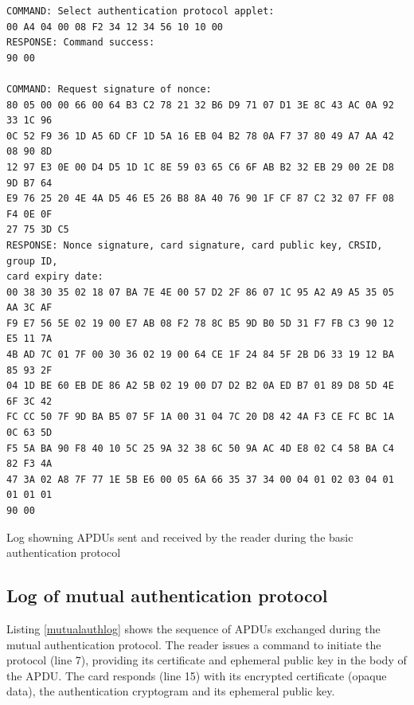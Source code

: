 \documentclass[12pt,a4paper,twoside,openright]{report}
\begin{document}
\begin{listing}
\begin{verbatim}
COMMAND: Select authentication protocol applet:
00 A4 04 00 08 F2 34 12 34 56 10 10 00
RESPONSE: Command success:
90 00

COMMAND: Request signature of nonce:
80 05 00 00 66 00 64 B3 C2 78 21 32 B6 D9 71 07 D1 3E 8C 43 AC 0A 92 33 1C 96
0C 52 F9 36 1D A5 6D CF 1D 5A 16 EB 04 B2 78 0A F7 37 80 49 A7 AA 42 08 90 8D
12 97 E3 0E 00 D4 D5 1D 1C 8E 59 03 65 C6 6F AB B2 32 EB 29 00 2E D8 9D B7 64
E9 76 25 20 4E 4A D5 46 E5 26 B8 8A 40 76 90 1F CF 87 C2 32 07 FF 08 F4 0E 0F
27 75 3D C5
RESPONSE: Nonce signature, card signature, card public key, CRSID, group ID,
card expiry date:
00 38 30 35 02 18 07 BA 7E 4E 00 57 D2 2F 86 07 1C 95 A2 A9 A5 35 05 AA 3C AF
F9 E7 56 5E 02 19 00 E7 AB 08 F2 78 8C B5 9D B0 5D 31 F7 FB C3 90 12 E5 11 7A
4B AD 7C 01 7F 00 30 36 02 19 00 64 CE 1F 24 84 5F 2B D6 33 19 12 BA 85 93 2F
04 1D BE 60 EB DE 86 A2 5B 02 19 00 D7 D2 B2 0A ED B7 01 89 D8 5D 4E 6F 3C 42
FC CC 50 7F 9D BA B5 07 5F 1A 00 31 04 7C 20 D8 42 4A F3 CE FC BC 1A 0C 63 5D
F5 5A BA 90 F8 40 10 5C 25 9A 32 38 6C 50 9A AC 4D E8 02 C4 58 BA C4 82 F3 4A
47 3A 02 A8 7F 77 1E 5B E6 00 05 6A 66 35 37 34 00 04 01 02 03 04 01 01 01 01
90 00
\end{verbatim}
\caption{Log showning APDUs sent and received by the reader during the basic authentication protocol}
\label{basicauthlog}
\end{listing}

\subsection{Log of mutual authentication protocol}

Listing \autoref{mutualauthlog} shows the sequence of APDUs exchanged during the mutual authentication protocol. The reader issues a command to initiate the protocol (line 7), providing its certificate and ephemeral public key in the body of the APDU. The card responds (line 15) with its encrypted certificate (opaque data), the authentication cryptogram and its ephemeral public key.
\end{document}

